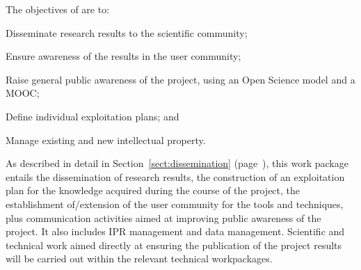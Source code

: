 \addtocounter{wpno}{1}
\begin{Workpackage}{\thewpno}
\WPTitle{\wpname{\thewpno}}

\begin{WPObjectives}
The objectives of \theWP{} are to:
\begin{compactitem}
  \item Disseminate research results to the scientific community;
  \item Ensure awareness of the results in the user community;
  \item Raise general public awareness of the \TheProject{} project, using an Open Science model and a MOOC;
  \item Define individual exploitation plans;
  and
  \item Manage existing and new intellectual property.
\end{compactitem}
\end{WPObjectives}

\begin{WPDescription}
As described in detail in Section~\ref{sect:dissemination} (page~\pageref{sect:dissemination}), this work package entails the dissemination of research results, the construction of an exploitation plan for the knowledge acquired during the course of the \TheProject{} project, 
the establishment of/extension of the user community for the \TheProject{} tools and techniques,
plus communication activities aimed at improving public awareness of the \TheProject{} project.
It also includes IPR management and data management.
Scientific and technical work aimed directly at ensuring the publication of the project results will be carried out within the relevant technical workpackages.
\end{WPDescription}

\begin{Task}




\TaskHeader{}



\end{Task}
\end{Workpackage}

